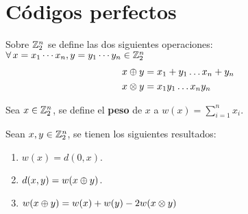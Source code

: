 \section{Códigos perfectos}

Sobre $\mathbb{Z}_2^n$ se define las dos siguientes operaciones: $\forall x=\palabraG, y=\palabraN{y}\in\Z_2^n$
\begin{align*}
	x\oplus y &= x_1+y_1\dots x_n+y_n\\
	x\otimes y &= x_1 y_1\dots x_n y_n
\end{align*}

\begin{definition}
	Sea $x\in\mathbb{Z}_2^n$, se define el \textbf{peso} de $x$ a $w(x)=\sum_{i=1}^n x_i$.
\end{definition}
\begin{lemma}
	Sean $x, y\in\mathbb{Z}_2^n$, se tienen los siguientes resultados:
	\begin{enumerate}
		\item $w(x) = d(0,x)$.
		\item $d(x,y)=w(x\oplus y)$.
		\item $w(x\oplus y)=w(x)+w(y)-2w(x\otimes y)$
	\end{enumerate}
\end{lemma}

